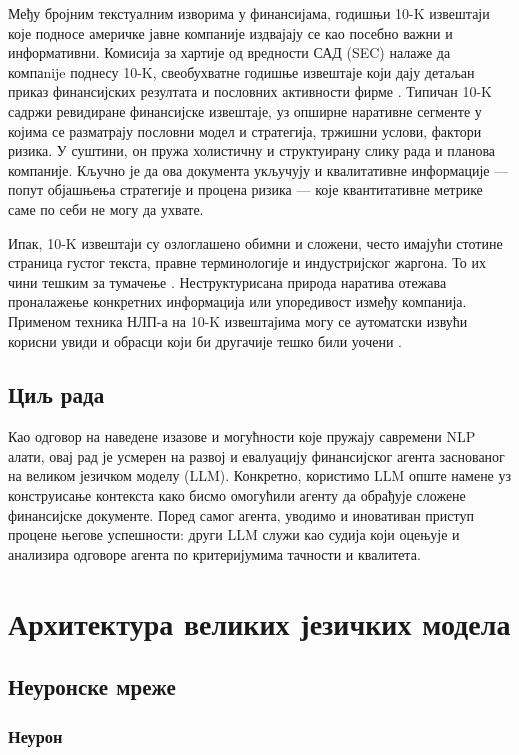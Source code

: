 \documentclass[a4paper, 12pt, master, utf8]{etf}
\begin{document}
Међу бројним текстуалним изворима у финансијама, годишњи 10-K извештаји које подносе америчке јавне компаније издвајају се као посебно важни и информативни. Комисија за хартије од вредности САД (SEC) налаже да компаnije поднесу 10-K, свеобухватне годишње извештаје који дају детаљан приказ финансијских резултата и пословних активности фирме \cite{yang_evaluating_2025}. Типичан 10-K садржи ревидиране финансијске извештаје, уз опширне наративне сегменте у којима се разматрају пословни модел и стратегија, тржишни услови, фактори ризика. У суштини, он пружа холистичну и структуирану слику рада и планова компаније. Кључно је да ова документа укључују и квалитативне информације — попут објашњења стратегије и процена ризика — које квантитативне метрике саме по себи не могу да ухвате.

Ипак, 10-K извештаји су озлоглашено обимни и сложени, често имајући стотине страница густог текста, правне терминологије и индустријског жаргона. То их чини тешким за тумачење \cite{yang_evaluating_2025}. Неструктурисана природа наратива отежава проналажење конкретних информација или упоредивост између компанија. Применом техника НЛП-а на 10-K извештајима могу се аутоматски извући корисни увиди и обрасци који би другачије тешко били уочени \cite{yang_evaluating_2025}.

\section{Циљ рада}
Као одговор на наведене изазове и могућности које пружају савремени NLP алати, овај рад је усмерен на развој и евалуацију финансијског агента заснованог на великом језичком моделу (LLM). Конкретно, користимо LLM опште намене уз конструисање контекста како бисмо омогућили агенту да обрађује сложене финансијске документе. Поред самог агента, уводимо и иновативан приступ процене његове успешности: други LLM служи као судија који оцењује и анализира одговоре агента по критеријумима тачности и квалитета. 


\chapter{Архитектура великих језичких модела}
\label{sec:2}

\section{Неуронске мреже}
\label{sec:4}

\subsection{Неурон}
\label{sec:4}
\end{document}
